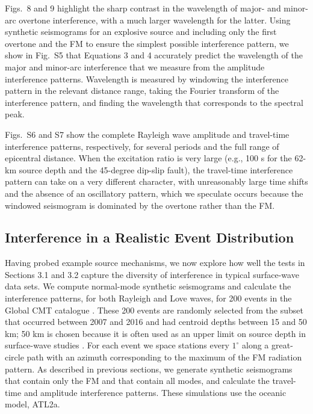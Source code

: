 \documentclass[extra,mreferee]{gji}
\begin{document}
Figs.\ 8 and 9 highlight the sharp contrast in the wavelength of major- and minor-arc overtone interference, with a much larger wavelength for the latter. Using synthetic seismograms for an explosive source and including only the first overtone and the FM to ensure the simplest possible interference pattern, we show in Fig.\ S5 that Equations 3 and 4 accurately predict the wavelength of the major and minor-arc interference that we measure from the amplitude interference patterns. Wavelength is measured by windowing the interference pattern in the relevant distance range, taking the Fourier transform of the interference pattern, and finding the wavelength that corresponds to the spectral peak. 

Figs.\ S6 and S7 show the complete Rayleigh wave amplitude and travel-time interference patterns, respectively, for several periods and the full range of epicentral distance. When the excitation ratio is very large (e.g., 100 s for the 62-km source depth and the 45-degree dip-slip fault), the travel-time interference pattern can take on a very different character, with unreasonably large time shifts and the absence of an oscillatory pattern, which we speculate occurs because the windowed seismogram is dominated by the overtone rather than the FM.

\subsection{Interference in a Realistic Event Distribution}

Having probed example source mechanisms, we now explore how well the tests in Sections 3.1 and 3.2 capture the diversity of interference in typical surface-wave data sets. We compute normal-mode synthetic seismograms and calculate the interference patterns, for both Rayleigh and Love waves, for 200 events in the Global CMT catalogue \citep{dziewonski1981determination,ekstrom2012global}. These 200 events are randomly selected from the subset that occurred between 2007 and 2016 and had centroid depths between 15 and 50 km; 50 km is chosen because it is often used as an upper limit on source depth in surface-wave studies \citep{xbaoattenuationsurfacewaves, eddy2018age, babikoff2019long}. For each event we  space stations every $1^\circ$ along a great-circle path with an azimuth corresponding to the maximum of the FM radiation pattern. As described in previous sections, we generate synthetic seismograms that contain only the FM and that contain all modes, and calculate the travel-time and amplitude interference patterns. These simulations use the oceanic model, ATL2a.
\end{document}
